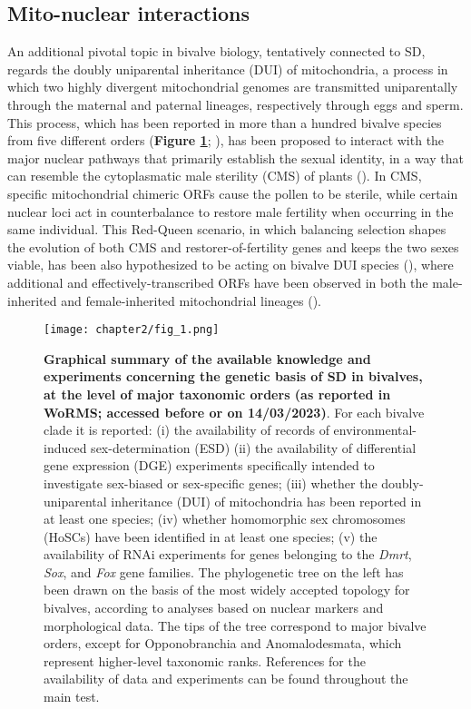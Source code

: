 \documentclass[../main.tex]{subfiles}
\begin{document}
\subsection{Mito-nuclear interactions}
An additional pivotal topic in bivalve biology, tentatively connected to SD, regards the doubly uniparental inheritance (DUI) of mitochondria, a process in which two highly divergent mitochondrial genomes are transmitted uniparentally through the maternal and paternal lineages, respectively through eggs and sperm. This process, which has been reported in more than a hundred bivalve species from five different orders (\textbf{Figure \ref{fig:summarySex}}; \textbf{\cite{gusman2016pursuing,capt2020unorthodox}}), has been proposed to interact with the major nuclear pathways that primarily establish the sexual identity, in a way that can resemble the cytoplasmatic male sterility (CMS) of plants (\textbf{\cite{ghiselli2013structure,breton2022did}}). In CMS, specific mitochondrial chimeric ORFs cause the pollen to be sterile, while certain nuclear loci act in counterbalance to restore male fertility when occurring in the same individual. This Red-Queen scenario, in which balancing selection shapes the evolution of both CMS and restorer-of-fertility genes and keeps the two sexes viable, has been also hypothesized to be acting on bivalve DUI species (\textbf{\cite{ghiselli2013structure,xu2022lack}}), where additional and effectively-transcribed ORFs have been observed in both the male-inherited and female-inherited mitochondrial lineages (\textbf{\cite{milani2013nuclear,milani2014paternally}}).

\begin{figure}
    \centering
    \texttt{[image: chapter2/fig\_1.png]}
    \captionsetup{width=\textwidth}
    \caption{
    \textbf{Graphical summary of the available knowledge and experiments concerning the genetic basis of SD in bivalves, at the level of major taxonomic orders (as reported in WoRMS; accessed before or on 14/03/2023)}. For each bivalve clade it is reported: (i) the availability of records of environmental-induced sex-determination (ESD) (ii) the availability of differential gene expression (DGE) experiments specifically intended to investigate sex-biased or sex-specific genes; (iii) whether the doubly-uniparental inheritance (DUI) of mitochondria has been reported in at least one species; (iv) whether homomorphic sex chromosomes (HoSCs) have been identified in at least one species; (v) the availability of RNAi experiments for genes belonging to the \textit{Dmrt}, \textit{Sox}, and \textit{Fox} gene families. The phylogenetic tree on the left has been drawn on the basis of the most widely accepted topology for bivalves, according to analyses based on nuclear markers and morphological data. The tips of the tree correspond to major bivalve orders, except for Opponobranchia and Anomalodesmata, which represent higher-level taxonomic ranks. References for the availability of data and experiments can be found throughout the main test.
    }
    \label{fig:summarySex}
\end{figure}
\end{document}

